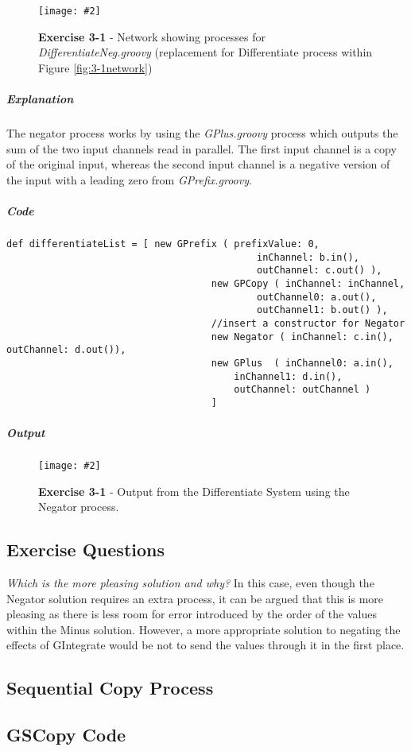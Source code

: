 \documentclass[10pt, a4paper]{article}
\newcommand{\figuremacro}[5]{
    \begin{figure}[#1]
        \centering
        \texttt{[image: \#2]}
        \caption[#3]{\textbf{#3}#4}
        \label{fig:#2}
    \end{figure}
}
\begin{document}
	\figuremacro{H}{negNetwork}{Exercise 3-1}{ - Network showing processes for \textit{DifferentiateNeg.groovy} (replacement for Differentiate process within Figure \ref{fig:3-1network})}{1.0}
	
	\subparagraph{Explanation}
	The negator process works by using the \textit{GPlus.groovy} process which outputs the sum of the two input channels read in parallel. The first input channel is a copy of the original input, whereas the second input channel is a negative version of the input with a leading zero from \textit{GPrefix.groovy}. 
	
	\subparagraph{Code}\hfill
	
	\begin{lstlisting}[caption = "DifferentiateNeg.groovy" ]
	def differentiateList = [ new GPrefix ( prefixValue: 0, 
											inChannel: b.in(), 
											outChannel: c.out() ),
									new GPCopy ( inChannel: inChannel,  
											outChannel0: a.out(), 
											outChannel1: b.out() ),
									//insert a constructor for Negator
									new Negator ( inChannel: c.in(), outChannel: d.out()),		   
									new GPlus  ( inChannel0: a.in(), 
										inChannel1: d.in(), 
										outChannel: outChannel ) 
									]	\end{lstlisting}
	
	\subparagraph{Output} \hfill
	
	\figuremacro{H}{output3-1neg}{Exercise 3-1}{ - Output from the Differentiate System using the Negator process.}{0.2}
	
	\subsection*{Exercise Questions}
	
	\textit{Which is the more pleasing solution and why?}
	In this case, even though the Negator solution requires an extra process, it can be argued that this is more pleasing as there is less room for error introduced by the order of the values within the Minus solution. However, a more appropriate solution to negating the effects of GIntegrate would be not to send the values through it in the first place.

	\subsection{Sequential Copy Process}
	\hfill
	\subsection*{GSCopy Code}
	
\end{document}
